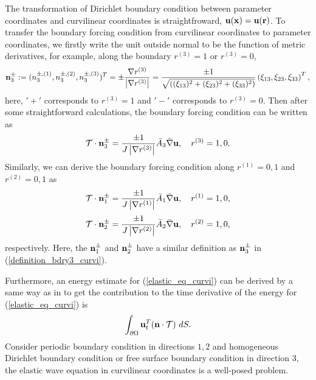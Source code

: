The transformation of Dirichlet boundary condition between parameter coordinates and curvilinear coordinates is straightfroward, ${\bf u}({\bf x}) = {\bf u}(\bf r)$. To transfer the boundary forcing condition from curvilinear coordinates to parameter coordinates, we firstly write the unit outside normal to be the function of metric derivatives, for example, along the boundary $r^{(3)} = 1$ or $r^{(3)} = 0$,
\begin{equation}\label{definition_bdry3_curvi}
{\bf n}_3^{\pm} := (n^{\pm,(1)}_3,n^{\pm,(2)}_3,n^{\pm,(3)}_3)^T = \pm \frac{\nabla r^{(3)}}{\left|\nabla r^{(3)}\right|} = \frac{\pm 1}{\sqrt{((\xi_{13})^2+(\xi_{23})^2+(\xi_{33})^2)}}\left(\xi_{13},\xi_{23},\xi_{33}\right)^T,
\end{equation}
here, $'+'$ corresponds to $r^{(3)} = 1$ and $'-'$ corresponds to $r^{(3)} = 0$. Then after some straightforward calculations, the boundary forcing condition can be written as
\begin{equation}\label{bdry3_curvi}
\mathcal{T}\cdot{\bf n}_3^{\pm} = \frac{\pm 1}{J\left|\nabla r^{(3)}\right|}\bar{A}_3\bar{\nabla}{\bf u}, \ \ \ r^{(3)} = 1, 0.
\end{equation}
Similarly, we can derive the boundary forcing condition along $r^{(1)} = 0,1$ and $r^{(2)} = 0,1$ as
\begin{equation}\label{bdry1_curvi}
\mathcal{T}\cdot{\bf n}_1^{\pm} = \frac{\pm 1}{J\left|\nabla r^{(1)}\right|}\bar{A}_1\bar{\nabla}{\bf u}, \ \ \ r^{(1)} = 1, 0,
\end{equation}
\begin{equation}\label{bdry2_curvi}
\mathcal{T}\cdot{\bf n}_2^{\pm} = \frac{\pm 1}{J\left|\nabla r^{(2)}\right|}\bar{A}_2\bar{\nabla}{\bf u}, \ \ \ r^{(2)} = 1, 0,
\end{equation} 
respectively. Here, the ${\bf n}_1^{\pm}$ and ${\bf n}_2^{\pm}$ have a similar definition as ${\bf n}_3^{\pm}$ in (\ref{definition_bdry3_curvi}).

Furthermore, an energy estimate for (\ref{elastic_eq_curvi}) can be derived by a same way as in \cite{petersson2015wave}  to get  the contribution to the time derivative of the energy for (\ref{elastic_eq_curvi}) is
\begin{equation}\label{bdry_integral_curvi}
\int_{\partial \Omega} {\bf u}_t^T({\bf n}\cdot\mathcal{T})\ dS.
\end{equation}
 Consider periodic boundary condition in directions $1,2$ and homogeneous Dirichlet boundary condition or free surface boundary condition in direction $3$, the elastic wave equation in curvilinear coordinates is a well-posed problem.
